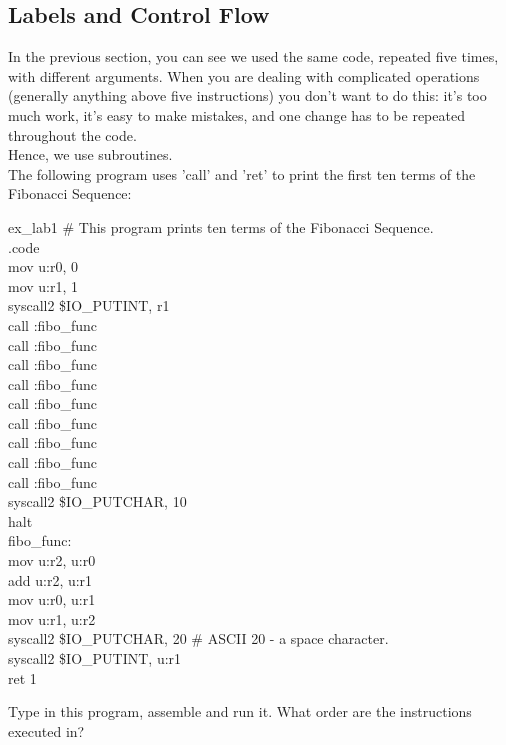 \documentclass[a4paper,oneside,openany]{book}
\begin{document}
\subsection{Labels and Control Flow}
In the previous section, you can see we used the same code, repeated five times,
with different arguments. When you are dealing with complicated operations (generally
anything above five instructions) you don't want to do this: it's too much work,
it's easy to make mistakes, and one change has to be repeated throughout the code.\\
Hence, we use subroutines.\\
The following program uses 'call' and 'ret' to print the first ten terms of the Fibonacci Sequence:
\begin{codefile}{ex\_lab1}
\# This program prints ten terms of the Fibonacci Sequence.\\
.code\\
\>	mov u:r0, 0\\
\>	mov u:r1, 1\\
\>	syscall2 \$IO\_PUTINT, r1\\
\>	call :fibo\_func\\
\>	call :fibo\_func\\
\>	call :fibo\_func\\
\>	call :fibo\_func\\
\>	call :fibo\_func\\
\>	call :fibo\_func\\
\>	call :fibo\_func\\
\>	call :fibo\_func\\
\>	call :fibo\_func\\
\>	syscall2 \$IO\_PUTCHAR, 10\\
\>	halt\\
\>fibo\_func:\\
\>	mov u:r2, u:r0\\
\>	add u:r2, u:r1\\
\>	mov u:r0, u:r1\\
\>	mov u:r1, u:r2\\
\>	syscall2 \$IO\_PUTCHAR, 20 \# ASCII 20 - a space character.\\
\>	syscall2 \$IO\_PUTINT, u:r1\\
\>	ret 1
\end{codefile}
Type in this program, assemble and run it. What order are the instructions executed in?\\
\\
\end{document}
